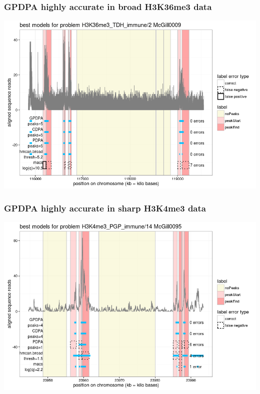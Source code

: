\documentclass{beamer}
\begin{document}


\begin{frame}
  \frametitle{GPDPA highly accurate in broad H3K36me3 data}
  \includegraphics[width=\textwidth]{figure-min-train-error-problem5-best}
\end{frame}

\begin{frame}
  \frametitle{GPDPA highly accurate in sharp H3K4me3 data}
  \includegraphics[width=\textwidth]{figure-min-train-error-problem2-best}
\end{frame} 
 
\end{document}
